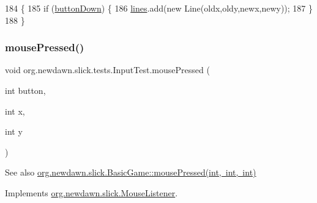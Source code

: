 \begin{DoxyCode}
184                                                                    \{
185         \textcolor{keywordflow}{if} (\mbox{\hyperlink{classorg_1_1newdawn_1_1slick_1_1tests_1_1_input_test_aaa3058a9f1d4a84c36dfc06c5e43944b}{buttonDown}}) \{
186             \mbox{\hyperlink{classorg_1_1newdawn_1_1slick_1_1tests_1_1_input_test_a374f7c88e7762229c37797c84638135c}{lines}}.add(\textcolor{keyword}{new} Line(oldx,oldy,newx,newy));
187         \}
188     \}
\end{DoxyCode}
\mbox{\label{classorg_1_1newdawn_1_1slick_1_1tests_1_1_input_test_a171626d9985a4dac34a09ad73ec99a1e}} 
\subsubsection{\texorpdfstring{mouse\+Pressed()}{mousePressed()}}
{\footnotesize\ttfamily void org.\+newdawn.\+slick.\+tests.\+Input\+Test.\+mouse\+Pressed (\begin{DoxyParamCaption}\item[{int}]{button,  }\item[{int}]{x,  }\item[{int}]{y }\end{DoxyParamCaption})\hspace{0.3cm}{\ttfamily [inline]}}

\begin{DoxySeeAlso}{See also}
\mbox{\hyperlink{classorg_1_1newdawn_1_1slick_1_1_basic_game_af00b33ec970972ecabe458cbc6d66e8a}{org.\+newdawn.\+slick.\+Basic\+Game\+::mouse\+Pressed(int, int, int)}} 
\end{DoxySeeAlso}


Implements \mbox{\hyperlink{interfaceorg_1_1newdawn_1_1slick_1_1_mouse_listener_aeca4c21a38aa31c408f3daf6f86c0925}{org.\+newdawn.\+slick.\+Mouse\+Listener}}.


